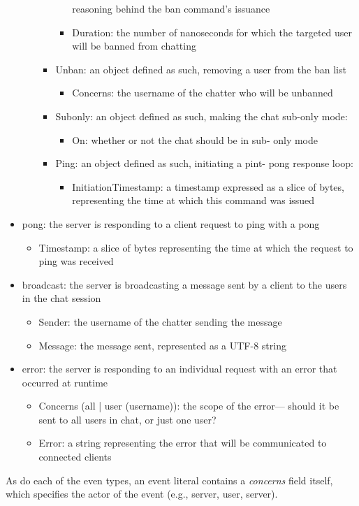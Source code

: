 \documentclass{article}
\begin{document}
\begin{itemize}
\begin{itemize}
\begin{itemize}
\begin{itemize}
								reasoning behind the ban command's issuance
							\item Duration: the number of nanoseconds for which
								the targeted user will be banned from chatting
						\end{itemize}
					\item Unban: an object defined as such, removing a user
						from the ban list
						\begin{itemize}
							\item Concerns: the username of the chatter who will
								be unbanned
						\end{itemize}
					\item Subonly: an object defined as such, making the chat
						sub-only mode:
						\begin{itemize}
							\item On: whether or not the chat should be in sub-
								only mode
						\end{itemize}
					\item Ping: an object defined as such, initiating a pint-
						pong response loop:
						\begin{itemize}
							\item InitiationTimestamp: a timestamp expressed as
								a slice of bytes, representing the time at which
								this command was issued
						\end{itemize}
				\end{itemize}
		\end{itemize}
	\item pong: the server is responding to a client request to ping with a pong
		\begin{itemize}
			\item Timestamp: a slice of bytes representing the time at which
				the request to ping was received
		\end{itemize}
	\item broadcast: the server is broadcasting a message sent by a client to the
		users in the chat session
		\begin{itemize}
			\item Sender: the username of the chatter sending the message
			\item Message: the message sent, represented as a UTF-8 string
		\end{itemize}
	\item error: the server is responding to an individual request with an
		error that occurred at runtime
		\begin{itemize}
			\item Concerns (all | user (username)): the scope of the error---
				should it be sent to all users in chat, or just one user?
			\item Error: a string representing the error that will be
				communicated to connected clients
		\end{itemize}
\end{itemize}

As do each of the even types, an event literal contains a \emph{concerns} field
itself, which specifies the actor of the event (e.g., server, user, server).
\end{document}
